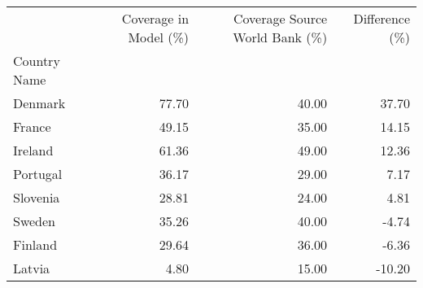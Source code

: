 \begin{tabular}{lrrr}
\toprule
 & Coverage in Model (\%) & Coverage Source World Bank (\%) & Difference (\%) \\
Country Name &  &  &  \\
\midrule
Denmark & 77.70 & 40.00 & 37.70 \\
France & 49.15 & 35.00 & 14.15 \\
Ireland & 61.36 & 49.00 & 12.36 \\
Portugal & 36.17 & 29.00 & 7.17 \\
Slovenia & 28.81 & 24.00 & 4.81 \\
Sweden & 35.26 & 40.00 & -4.74 \\
Finland & 29.64 & 36.00 & -6.36 \\
Latvia & 4.80 & 15.00 & -10.20 \\
\bottomrule
\end{tabular}
